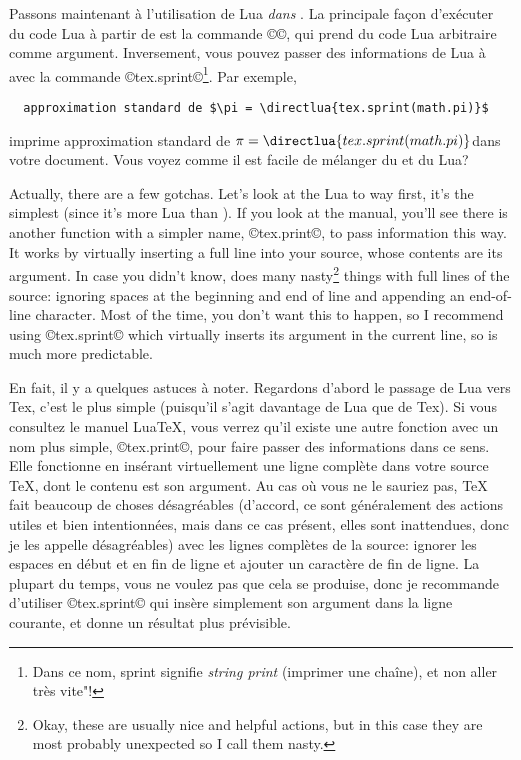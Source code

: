\documentclass{lltxdoc}
\begin{document}
\medskip

Passons maintenant à l'utilisation de Lua \emph{dans} \luatex. La principale
façon d'exécuter du code Lua à partir de \tex est la commande ©\directlua©,
qui prend du code Lua arbitraire comme argument. Inversement, vous pouvez
passer des informations de Lua à \tex avec la commande ©tex.sprint©\footnote{Dans
  ce nom, \og{}sprint\gf{} signifie \og{}\emph{string print}\fg{}
  (\og{}imprimer une chaîne\fg{}), et non \og{}aller très vite"\fg{}!}.
Par exemple,
\begin{Verbatim}
  approximation standard de $\pi = \directlua{tex.sprint(math.pi)}$
\end{Verbatim}
imprime \og{}approximation standard de $\pi = \directlua{tex.sprint(math.pi)}$\fg dans votre document. Vous voyez comme il est facile de mélanger du \tex et du Lua?

Actually, there are a few gotchas. Let's look at the Lua to \tex way first,
it's the simplest (since it's more Lua than \tex). If you look at the \luatex
manual, you'll see there is another function with a simpler name, ©tex.print©,
to pass information this way. It works by virtually inserting a full line into
your \tex source, whose contents are its argument. In case you didn't know,
\tex does many nasty\footnote{Okay, these are usually nice and helpful
  actions, but in this case they are most probably unexpected so I call them
  nasty.} things with full lines of the source:
ignoring spaces at the beginning and end of line and appending an end-of-line
character. Most of the time, you don't want this to happen, so I recommend
using ©tex.sprint© which virtually inserts its argument in the current line,
so is much more predictable.

En fait, il y a quelques astuces à noter. Regardons d'abord le passage de Lua vers Tex, c'est le plus simple (puisqu'il s'agit davantage de Lua que de Tex). Si vous consultez le manuel LuaTeX, vous verrez qu'il existe une autre fonction avec un nom plus simple, ©tex.print©, pour faire passer des informations dans ce sens. Elle fonctionne en insérant virtuellement une ligne complète dans votre source TeX, dont le contenu est son argument. Au cas où vous ne le sauriez pas, TeX fait beaucoup de choses désagréables (d'accord, ce sont généralement des actions utiles et bien intentionnées, mais dans ce cas présent, elles sont inattendues, donc je les appelle désagréables) avec les lignes complètes de la source: ignorer les espaces en début et en fin de ligne et ajouter un caractère de fin de ligne. La plupart du temps, vous ne voulez pas que cela se produise, donc je recommande d'utiliser ©tex.sprint© qui insère simplement son argument dans la ligne courante, et donne un résultat plus prévisible.
\end{document}
